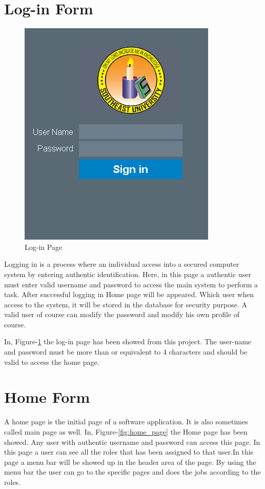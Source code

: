 \documentclass[12pt]{report} %
\begin{document}
\section{Log-in Form}

\begin{figure}[h]
	\begin{center}
	\includegraphics[width=.5\textwidth]{pic/login_page.png}
	\end{center}
	\caption{Log-in Page}
	\label{fig:login_page}
\end{figure}


Logging in is a process where an individual access into a secured computer system by entering authentic identification. Here, in this page a authentic user must enter valid username and password to access the main system to perform a task. After successful logging in Home page will be appeared. Which user when access to the system, it will be stored in the database for security purpose. A valid user of course can modify the password and modify his own profile of course.


In, Figure-\ref{fig:login_page} the log-in page has been showed from this project. The user-name and password must be more than or equivalent to 4 characters and should be valid to access the home page. 





\section{Home Form}

A home page  is the initial page of a software application. It is also sometimes called main page as well. In, Figure-\ref{fig:home_page} the Home page has been showed. Any user with authentic username and password can access this page. In this page a user can see all the roles that has been assigned to that user.In this page a menu bar will be showed up in the header area of the page. By using the menu bar the user can go to the specific pages and does the jobs according to the roles.
\end{document}
